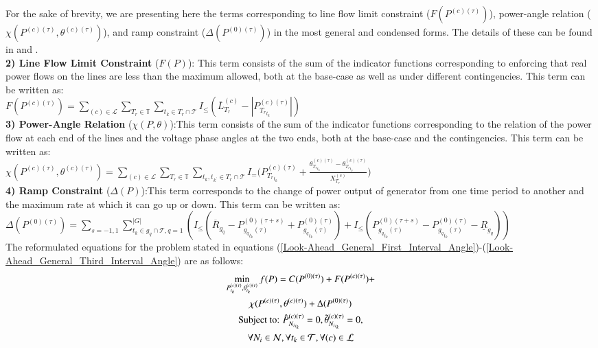 \documentclass[preprint,12pt,3p]{elsarticle}
\begin{document}
	For the sake of brevity, we are presenting here the terms corresponding to line flow limit constraint ($F(P^{(c)(\tau)})$), power-angle relation ($\chi(P^{(c)(\tau)},\theta^{(c)(\tau)})$), and ramp constraint ($\Delta(P^{(0)(\tau)})$) in the most general and condensed forms. The details of these can be found in \cite{CK:14} and \cite{Sambuddha2017}.\\
	\textbf{2) Line Flow Limit Constraint} ($F(P)$): This term consists of the sum of the indicator functions corresponding to enforcing that real power flows on the lines are less than the maximum allowed, both at the base-case as well as under different contingencies. This term can be written as:\\
	$F(P^{(c)(\tau)})=\sum_{(c)\in\mathcal{L}}\sum_{T_r\in \mathbb{T}}\sum_{t_k\in T_r\cap{\mathcal{T}}}I_{\leq}({\overline{L}}_{T_r}^{(c)}-|{P}_{{T_r}_{t_k}}^{(c)(\tau)}|)$\\
	\textbf{3) Power-Angle Relation} ($\chi(P,\theta)$):This term consists of the sum of the indicator functions corresponding to the relation of the power flow at each end of the lines and the voltage phase angles at the two ends, both at the base-case and the contingencies. This term can be written as:\\
	$\chi(P^{(c)(\tau)},\theta^{(c)(\tau)})=\sum_{(c)\in\mathcal{L}}\sum_{T_r\in \mathbb{T}}\sum_{t_k,t_{k^{'}}\in T_r\cap{\mathcal{T}}}I_{=}\Bigg({P}_{{T_r}_{t_k}}^{(c)(\tau)}+\frac{{\theta}_{{T_r}_{t_k}}^{(c)(\tau)}-{\theta}_{{T_r}_{t_{k^{'}}}}^{(c)(\tau)}}{{X}_{T_r}^{(c)}}\Bigg)$\\
	\textbf{4) Ramp Constraint} ($\Delta(P)$):This term corresponds to the change of power output of generator from one time period to another and the maximum rate at which it can go up or down. This term can be written as:\\
	$\Delta(P^{(0)(\tau)})=\sum_{s=-1,1}\sum_{t_k\in g_q\cap{\mathcal{T}}, q=1}^{|G|}(I_{\leq}(\overline{R}_{g_q}-P_{{g_q}_{t_k}(\tau)}^{(0)(\tau+s)}+P_{{g_q}_{t_k}(\tau)}^{(0)(\tau)})+I_{\leq}(P_{{g_q}_{t_k}(\tau)}^{(0)(\tau+s)}-P_{{g_q}_{t_k}(\tau)}^{(0)(\tau)}-\underline{R}_{g_q}))$\\
	The reformulated equations for the problem stated in equations (\ref{Look-Ahead_General_First_Interval_Angle})-(\ref{Look-Ahead_General_Third_Interval_Angle}) are as follows:
	\begin{subequations}\label{DTN_for_Contingency_General_Looakahead_Demand}
		\begin{gather}
		\min_{P_{t_k}^{(c)(\tau)}, \theta_{t_k}^{(c)(\tau)}}f(P)=C(P^{(0)(\tau)})
		+F(P^{(c)(\tau)})+\notag\\\chi(P^{(c)(\tau)},\theta^{(c)(\tau)})
		+\Delta(P^{(0)(\tau)})\label{DTN_for_Contingency_General_Looakahead_Demand1}\\
		\text{Subject to: }\hat{P}_{{N_i}_{t_k}}^{(c)(\tau)}=0, \tilde{\theta}_{{N_i}_{t_k}}^{(c)(\tau)}=0,\notag\\\forall N_i\in\mathcal{N}, \forall t_k\in\mathcal{T}, \forall (c)\in\mathcal{L}\label{DTN_for_Contingency_General_Looakahead_Demand2}
		\end{gather}
	\end{subequations}
\end{document}
